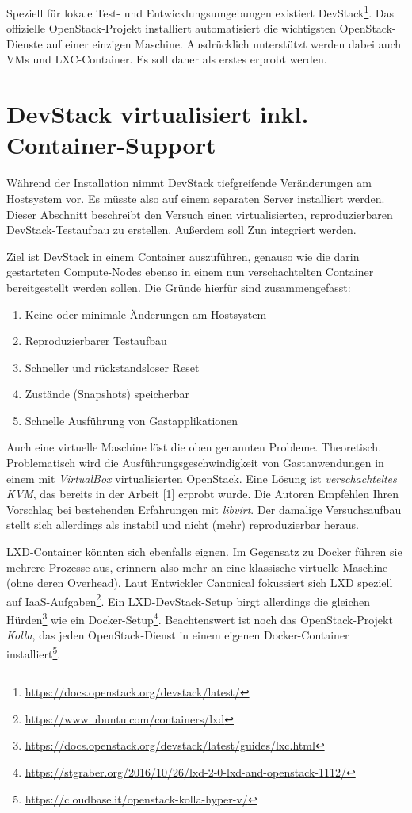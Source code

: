 Speziell für lokale Test- und Entwicklungsumgebungen existiert DevStack\footnote{\url{https://docs.openstack.org/devstack/latest/}}. Das offizielle OpenStack-Projekt installiert automatisiert die wichtigsten OpenStack-Dienste auf einer einzigen Maschine. Ausdrücklich unterstützt werden dabei auch VMs und LXC-Container. Es soll daher als erstes erprobt werden.


\section{DevStack virtualisiert inkl. Container-Support}

Während der Installation nimmt DevStack tiefgreifende Veränderungen am Hostsystem vor. Es müsste also auf einem separaten Server installiert werden. Dieser Abschnitt beschreibt den Versuch einen virtualisierten, reproduzierbaren DevStack-Testaufbau zu erstellen. Außerdem soll Zun integriert werden. 

Ziel ist DevStack in einem Container auszuführen, genauso wie die darin gestarteten Compute-Nodes ebenso in einem nun verschachtelten Container bereitgestellt werden sollen. Die Gründe hierfür sind zusammengefasst:

\begin{enumerate}
	\item Keine oder minimale Änderungen am Hostsystem
	\item Reproduzierbarer Testaufbau
	\item Schneller und rückstandsloser Reset
	\item Zustände (Snapshots) speicherbar
	\item Schnelle Ausführung von Gastapplikationen
\end{enumerate}

\noindent Auch eine virtuelle Maschine löst die oben genannten Probleme. Theoretisch. Problematisch wird die Ausführungsgeschwindigkeit von Gastanwendungen in einem mit \emph{VirtualBox} virtualisierten OpenStack. Eine Lösung ist \emph{verschachteltes KVM}, das bereits in der Arbeit [1] erprobt wurde. Die Autoren Empfehlen Ihren Vorschlag bei bestehenden Erfahrungen mit \emph{libvirt}. Der damalige Versuchsaufbau stellt sich allerdings als instabil und nicht (mehr) reproduzierbar heraus. %


LXD-Container könnten sich ebenfalls eignen. Im Gegensatz zu Docker führen sie mehrere Prozesse aus, erinnern also mehr an eine klassische virtuelle Maschine (ohne deren Overhead). Laut Entwickler Canonical fokussiert sich LXD speziell auf IaaS-Aufgaben\footnote{\url{https://www.ubuntu.com/containers/lxd}}. Ein LXD-DevStack-Setup birgt allerdings die gleichen Hürden\footnote{\url{https://docs.openstack.org/devstack/latest/guides/lxc.html}} wie ein Docker-Setup\footnote{\url{https://stgraber.org/2016/10/26/lxd-2-0-lxd-and-openstack-1112/}}. Beachtenswert ist noch das OpenStack-Projekt \emph{Kolla}, das jeden OpenStack-Dienst in einem eigenen Docker-Container installiert\footnote{\url{https://cloudbase.it/openstack-kolla-hyper-v/}}.

